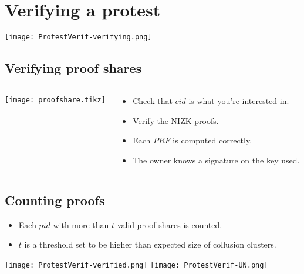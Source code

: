 \section[Verifying]{Verifying a protest}

\begin{frame}
  \centering
  \texttt{[image: ProtestVerif-verifying.png]}
\end{frame}

\subsection{Verifying proof shares}

\begin{frame}
  \begin{columns}
    \begin{column}{0.5\linewidth}
      \tiny
      \texttt{[image: proofshare.tikz]}
    \end{column}

    \begin{column}{0.5\linewidth}
      \begin{itemize}
        \item Check that \(cid\) is what you're interested in.
        \item Verify the \ac{NIZK} proofs.
        \item Each \(PRF\) is computed correctly.
        \item The owner knows a signature on the key used.
      \end{itemize}
    \end{column}
  \end{columns}
\end{frame}

\subsection{Counting proofs}

\begin{frame}
  \begin{itemize}
    \item Each \(pid\) with more than \(t\) valid proof shares is counted.
    \item \(t\) is a threshold set to be higher than expected size of collusion 
      clusters.
  \end{itemize}
\end{frame}

\begin{frame}
  \centering
  \texttt{[image: ProtestVerif-verified.png]}
  \texttt{[image: ProtestVerif-UN.png]}
\end{frame}


